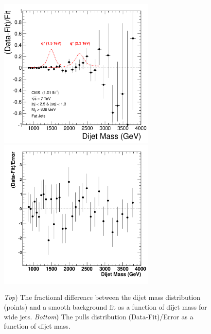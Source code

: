 \begin{figure}[!ht]
  \begin{center}
    \includegraphics[width=0.7\textwidth]{Figures/Fractional_Diff_fat.pdf}
    \includegraphics[width=0.7\textwidth]{Figures/Pulls_fat.pdf}
    \caption{ \textit{Top}) The fractional difference between the
dijet mass distribution (points) and a smooth background fit as a
function of dijet mass for wide jets. \textit{Bottom}) The pulls distribution
(Data-Fit)/Error as a function of dijet mass.}
    \label{FracDiff_wide}
  \end{center}
\end{figure}

